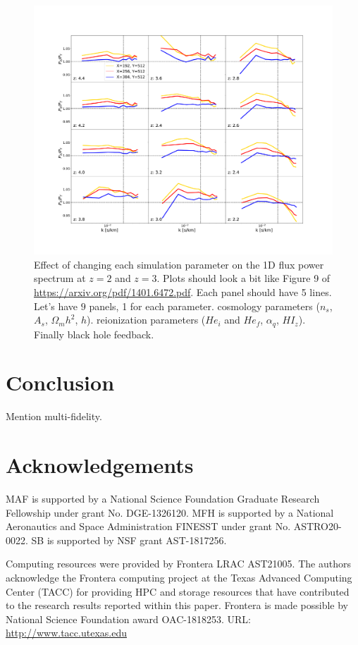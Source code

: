 \documentclass[a4paper,11pt]{article}
\begin{document}
\begin{figure}
    \centering
	\includegraphics[width=\columnwidth]{figures/fps_mfr.pdf}
    \caption{Effect of changing each simulation parameter on the 1D flux power spectrum at $z=2$ and $z=3$. Plots should look a bit like Figure 9 of \url{https://arxiv.org/pdf/1401.6472.pdf}. Each panel should have 5 lines. Let's have $9$ panels, 1 for each parameter. cosmology parameters ($n_s$, $A_s$, $\Omega_m h^2$, $h$). reionization parameters ($He_i$ and $He_f$, $\alpha_q$, $HI_z$). Finally black hole feedback. }
    \label{fig:fluxpower}
\end{figure}

\section{Conclusion}

Mention multi-fidelity.

\section*{Acknowledgements}
MAF is supported by a National Science Foundation Graduate Research Fellowship under grant No. DGE-1326120.
MFH is supported by a National Aeronautics and Space Administration FINESST under grant No. ASTRO20-0022.
SB is supported by NSF grant AST-1817256.

Computing resources were provided by Frontera LRAC AST21005.
The authors acknowledge the Frontera computing project at the Texas Advanced Computing Center (TACC) for providing HPC and storage resources that have contributed to the research results reported within this paper.
Frontera is made possible by National Science Foundation award OAC-1818253.
URL: \url{http://www.tacc.utexas.edu}
\end{document}
